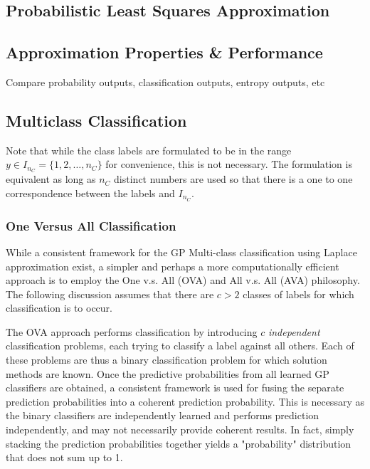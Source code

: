 		\subsection{Probabilistic Least Squares Approximation}
		\label{BenthicHabitatMapping:Classification:ProbabilisticLeastSquaresApproximation}
		
		\subsection{Approximation Properties \& Performance}
		\label{BenthicHabitatMapping:Classification:ApproximationPerformance}
		
			Compare probability outputs, classification outputs, entropy outputs, etc
		
		\subsection{Multiclass Classification}
		\label{BenthicHabitatMapping:Classification:MulticlassClassification}
		
		
			Note that while the class labels are formulated to be in the range $y \in I_{n_{C}} = \{1, 2, \dots, n_{C}\}$ for convenience, this is not necessary. The formulation is equivalent as long as $n_{C}$ distinct numbers are used so that there is a one to one correspondence between the labels and $I_{n_{C}}$.
			
			
			\subsubsection{One Versus All Classification}
			\label{BenthicHabitatMapping:Classification:MulticlassClassification:OVA}
			
				While a consistent framework for the GP Multi-class classification using Laplace approximation exist, a simpler and perhaps a more computationally efficient approach is to employ the One v.s. All (OVA) and All v.s. All (AVA) philosophy. The following discussion assumes that there are $c > 2$ classes of labels for which classification is to occur. 
					
				The OVA approach performs classification by introducing $c$ \textit{independent} classification problems, each trying to classify a label against all others. Each of these problems are thus a binary classification problem for which solution methods are known. Once the predictive probabilities from all learned GP classifiers are obtained, a consistent framework is used for fusing the separate prediction probabilities into a coherent prediction probability. This is necessary as the binary classifiers are independently learned and performs prediction independently, and may not necessarily provide coherent results. In fact, simply stacking the prediction probabilities together yields a "probability" distribution that does not sum up to 1.
					
